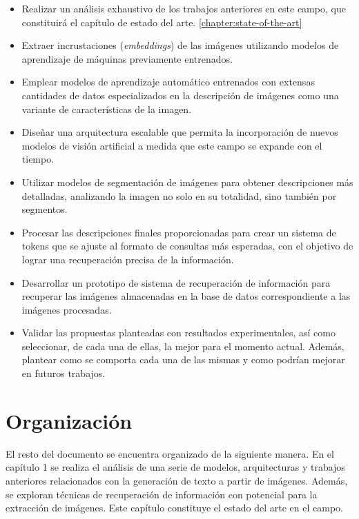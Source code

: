 \begin{itemize}
\item Realizar un an\'alisis exhaustivo de los trabajos anteriores en este campo, que constituir\'a el cap\'itulo de estado del arte. \ref{chapter:state-of-the-art}   
\item Extraer incrustaciones (\textit{embeddings}) de las im\'agenes utilizando modelos de aprendizaje de m\'aquinas previamente entrenados.
\item Emplear modelos de aprendizaje autom\'atico entrenados con extensas cantidades de datos especializados en la descripci\'on de im\'agenes como una variante de caracter\'isticas de la imagen.
\item Dise\~nar una arquitectura escalable que permita la incorporaci\'on de nuevos modelos de visi\'on artificial a medida que este campo se expande con el tiempo.
\item Utilizar modelos de segmentaci\'on de im\'agenes para obtener descripciones m\'as detalladas, analizando la imagen no solo en su totalidad, sino tambi\'en por segmentos.
\item Procesar las descripciones finales proporcionadas para crear un sistema de tokens que se ajuste al formato de consultas m\'as esperadas, con el objetivo de lograr una recuperaci\'on precisa de la informaci\'on.
\item Desarrollar un prototipo de sistema de recuperaci\'on de informaci\'on para recuperar las im\'agenes almacenadas en la base de datos correspondiente a las im\'agenes procesadas.
\item Validar las propuestas planteadas con resultados experimentales, as\'i como seleccionar, de cada una de ellas, la mejor para el momento actual. Adem\'as, plantear como se comporta cada una de las mismas y como podr\'ian mejorar en futuros trabajos.
\end{itemize}

\section*{Organizaci\'on}
El resto del documento se encuentra organizado de la siguiente manera. En el cap\'itulo 1 se realiza el an\'alisis de una serie de modelos, arquitecturas y trabajos anteriores relacionados con la generaci\'on de texto a partir de im\'agenes. Adem\'as, se exploran t\'ecnicas de recuperaci\'on de informaci\'on con potencial para la extracci\'on de im\'agenes. Este cap\'itulo constituye el estado del arte en el campo.

